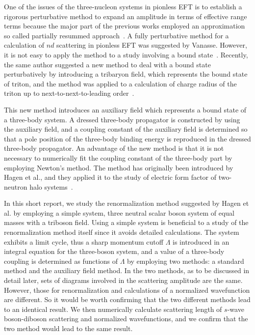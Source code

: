 \documentclass[jkps,preprint,fleqn,showpacs,showkeys]{revtex4}
\begin{document}
One of the issues of the three-nucleon systems in pionless EFT
is to establish a rigorous perturbative method to expand an amplitude 
in terms of effective range terms
because the major part of the previous works employed an approximation
so called partially resummed approach~\cite{gbg-npa00}.
%
A fully perturbative method for a calculation of
$nd$ scattering in pionless EFT was suggested by Vanasse.
However, it is not easy to apply the method to a study involving
a bound state~\cite{v-prc13}.
Recently, the same author suggested a new method to deal with
a bound state perturbatively by introducing a tribaryon field,
which represents the bound state of triton, and the method was
applied to a calculation of charge radius of the triton up to
next-to-next-to-leading order~\cite{v-16}.

This new method introduces an auxiliary field which
represents a bound state of a three-body system.
A dressed three-body propagator is constructed
by using the auxiliary field, and a coupling constant
of the auxiliary field is determined so that
a pole position of the three-body binding energy
is reproduced in the dressed three-body propagator.
%
An advantage of the new method is that it is not necessary
to numerically fit the coupling constant of the three-body
part by employing Newton's method.
%
The method has originally been introduced by Hagen et al.,
and they applied it to the study of electric form factor
of two-neutron halo systems~\cite{hhp-epja13}.

In this short report,
we study the renormalization method suggested
by Hagen et al. by employing a simple system,
three neutral scalar boson system of equal masses
with a triboson field.
% 
Using a simple system is beneficial
to a study of the renormalization method itself
since it avoids detailed calculations.
%
The system exhibits a limit cycle,
thus a sharp momentum cutoff $\Lambda$ is introduced
in an integral equation for the three-boson system,
and a value of a three-body coupling is determined
as functions of $\Lambda$
by employing two methods: a standard method and the auxiliary field method.
%
In the two methods, as to be discussed in detail later,
sets of diagrams involved in the scattering amplitude are the same.
However, those for renormalization and calculations of a normalized
wavefunction are different.
So it would be worth confirming that the two different methods
lead to an identical result.
%
We then numerically calculate scattering length of $s$-wave
boson-diboson scattering and normalized wavefunctions,
and we confirm that the two method would lead to the same result.
\end{document}
